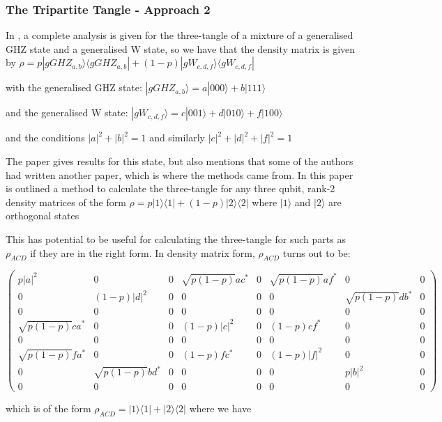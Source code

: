 \documentclass[12pt,a4paper]{article}
\numberwithin{equation}{section}
\begin{document}
\subsubsection{The Tripartite Tangle - Approach 2}
\label{subsubsec:fourTripartite2}

In \cite{EOSU}, a complete analysis is given for the three-tangle of a mixture of a generalised GHZ state and a generalised W state, so we have that the density matrix is given by $\rho = p|gGHZ_{a,b}\rangle\langle gGHZ_{a,b}| + (1-p)|gW_{c,d,f}\rangle\langle gW_{c,d,f}|$

\noindent with the generalised GHZ state: $|gGHZ_{a,b}\rangle = a|000\rangle + b|111\rangle$

\noindent and the generalised W state: $|gW_{c,d,f}\rangle = c|001\rangle + d|010\rangle + f|100\rangle$

\noindent and the conditions $|a|^2 + |b|^2 = 1$ and similarly $|c|^2 + |d|^2 + |f|^2 = 1$

The paper gives results for this state, but also mentions that some of the authors had written another paper, \cite{LOSU} which is where the methods came from. In this paper is outlined a method to calculate the three-tangle for any three qubit, rank-2 density matrices of the form $\rho = p|1\rangle\langle1| + (1-p)|2\rangle\langle2|$ where $|1\rangle$ and $|2\rangle$ are orthogonal states

This has potential to be useful for calculating the three-tangle for such parts as $\rho_{ACD}$ if they are in the right form. In density matrix form, $\rho_{ACD}$ turns out to be:

\noindent $\begin{pmatrix} p|a|^2 & 0 & 0 & \sqrt{p(1-p)}ac^* & 0 & \sqrt{p(1-p)}af^* & 0 & 0 \\ 0 & (1-p)|d|^2 & 0 & 0 & 0 & 0 & \sqrt{p(1-p)}db^* & 0 \\ 0 & 0 & 0 & 0 & 0 & 0 & 0 & 0 \\ \sqrt{p(1-p)}ca^* & 0 & 0 & (1-p)|c|^2 & 0 & (1-p)cf^* & 0 & 0 \\ 0 & 0 & 0 & 0 & 0 & 0 & 0 & 0 \\ \sqrt{p(1-p)}fa^* & 0 & 0 & (1-p)fc^* & 0 & (1-p)|f|^2 & 0 & 0 \\ 0 & \sqrt{p(1-p)}bd^* & 0 & 0 & 0 & 0 & p|b|^2 & 0 \\ 0 & 0 & 0 & 0 & 0 & 0 & 0 & 0 \end{pmatrix}$

\vskip 2mm

which is of the form $\rho_{ACD} = |1\rangle\langle1| + |2\rangle\langle2|$ where we have
\end{document}
